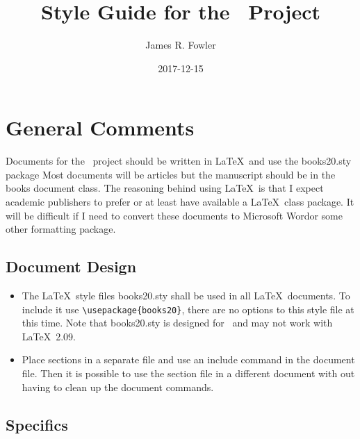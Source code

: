\documentclass{article}
\begin{document}
\title{Style Guide for the \PTitle\ Project}
\author{James R. Fowler}
\date{2017-12-15}

\maketitle

\section{General Comments}

Documents for the \PTitle\ project should be written in \LaTeX\ and use
the books20.sty package Most documents will be articles but the
manuscript should be in the books document class. The reasoning behind
using \LaTeX\ is that I expect academic publishers to prefer or at
least have available a \LaTeX\ class package.  It will be difficult if
I need to convert these documents to Microsoft Word\texttrademark or
some other formatting package.

\subsection{Document Design}

\begin{itemize}
  
\item The \LaTeX\ style files books20.sty shall be used in all
  \LaTeX\ documents. To include it use \verb|\usepackage{books20}|, there
  are no options to this style file at this time. Note that books20.sty
  is designed for \LaTeXe\ and may not work with \LaTeX\ 2.09.
  

\item Place sections in a separate file and use an include command in the
  document file. Then it is possible to use the section file in a
  different document with out having to clean up the document commands.

\end{itemize}

\subsection{Specifics}
\end{document}
